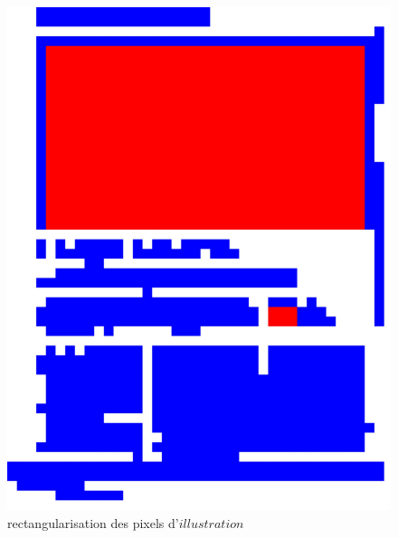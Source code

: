\documentclass{book}
\begin{document}
\begin{figure}[H]
\begin{center}
\includegraphics[scale=0.06]{images/rect_1_res_hog_hsv_kmeans_2.jpg}
\end{center}
\caption{\og rectangularisation \fg{} des pixels d'$illustration$}
\label{rect3}
\end{figure}
\end{document}
